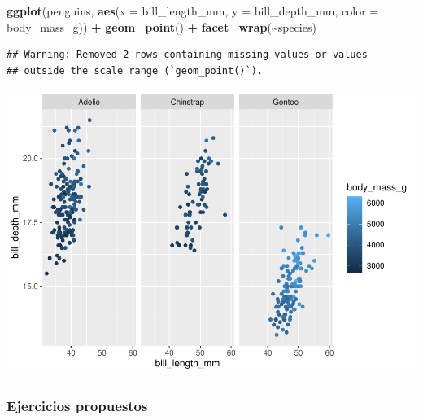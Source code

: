 \documentclass[
]{book}
\newenvironment{Shaded}{\begin{snugshade}}{\end{snugshade}}
\newcommand{\AttributeTok}[1]{\textcolor[rgb]{0.13,0.29,0.53}{#1}}
\newcommand{\FunctionTok}[1]{\textcolor[rgb]{0.13,0.29,0.53}{\textbf{#1}}}
\newcommand{\NormalTok}[1]{#1}
\newcommand{\SpecialCharTok}[1]{\textcolor[rgb]{0.81,0.36,0.00}{\textbf{#1}}}
\begin{document}
\begin{Shaded}
\begin{Highlighting}[]
\FunctionTok{ggplot}\NormalTok{(penguins, }\FunctionTok{aes}\NormalTok{(}\AttributeTok{x =}\NormalTok{ bill\_length\_mm, }\AttributeTok{y =}\NormalTok{ bill\_depth\_mm, }\AttributeTok{color =}\NormalTok{ body\_mass\_g)) }\SpecialCharTok{+}
  \FunctionTok{geom\_point}\NormalTok{() }\SpecialCharTok{+}
  \FunctionTok{facet\_wrap}\NormalTok{(}\SpecialCharTok{\textasciitilde{}}\NormalTok{species)}
\end{Highlighting}
\end{Shaded}

\begin{verbatim}
## Warning: Removed 2 rows containing missing values or values
## outside the scale range (`geom_point()`).
\end{verbatim}

\includegraphics{bookdown-demo_files/figure-latex/unnamed-chunk-197-1.pdf}

\subsubsection{Ejercicios propuestos}\label{ejercicios-propuestos}
\end{document}
